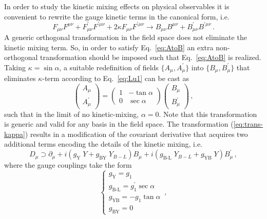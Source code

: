\documentclass[a4paper,11pt]{article}
\renewcommand{\(}{\left(}
\renewcommand{\)}{\right)}
\renewcommand{\[}{\left[}
\renewcommand{\]}{\right]}
\newcommand{\ro}[1]{\textrm{#1}}
\begin{document}
In order to study the kinetic mixing effects on physical observables it is convenient to rewrite the gauge kinetic terms in the canonical form, i.e.
%
\begin{equation}
	F_{\mu \nu} F^{\mu \nu} + F^\prime_{\mu \nu} F^{\prime \mu \nu} + 2 \kappa F_{\mu \nu} F^{\prime \mu \nu} \to B_{\mu \nu} B^{\mu \nu} + B^\prime_{\mu \nu} B^{\prime \mu \nu}\,.
	\label{eq:AtoB}
\end{equation}
%
A generic orthogonal transformation in the field space does not eliminate the kinetic mixing term. So, in order to satisfy Eq.~\eqref{eq:AtoB} an extra non-orthogonal transformation should be imposed such that Eq.~\eqref{eq:AtoB} is realized. Taking $\kappa = \sin \alpha$, a suitable redefinition of fields $\{A_\mu,A_\mu^\prime\}$ into $\{B_\mu, B_\mu^\prime\}$ that eliminates $\kappa$-term according to Eq.~\eqref{eq:Lu1} can be cast as
\begin{equation}
	\begin{pmatrix}
	A_\mu \\
	A^\prime_\mu 
	\end{pmatrix}
	=
	\begin{pmatrix}
	1 & -\tan \alpha \\
	0 & \sec \alpha 
	\end{pmatrix}
	\begin{pmatrix}
	B_\mu \\
	B^\prime_\mu 
	\end{pmatrix}\,,
	\label{eq:trans-kappa}
\end{equation}
such that in the limit of no kinetic-mixing, $\alpha = 0$. Note that this transformation is generic and valid for any basis in the field space. The transformation (\ref{eq:trans-kappa}) results in a modification of the covariant derivative that acquires two additional terms encoding the details of the kinetic mixing, i.e.
\begin{equation}
D_\mu \supset \partial_\mu + i \(g_\ro{Y} \; Y + g_\ro{BY} \; Y_{B-L}\) B_\mu + i \(g_\ro{B-L} \; Y_{B-L} + g_\ro{YB} \; Y\) B_\mu^\prime\,,
\label{eq:newCov}
\end{equation}	
where the gauge couplings take the form
\begin{equation}
	\begin{cases}
	g_\ro{Y} = g_1 \\
	g_\ro{B-L} = g_1^\prime \sec \alpha \\
	g_\ro{YB} = -g_1 \tan \alpha \\
	g_\ro{BY} = 0
	\end{cases} \,,
	\label{eq:new-g-simp}
\end{equation}
\end{document}
